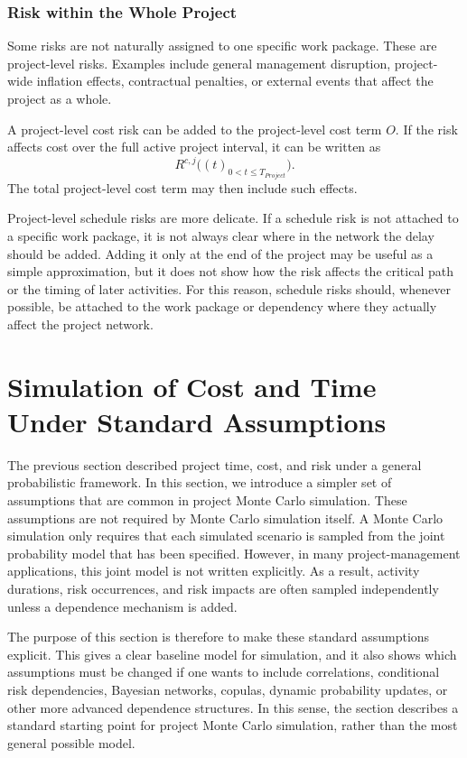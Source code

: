 \documentclass[11pt,a4paper]{article}
\newcommand{\1}{\mathbf{1}}
\theoremstyle{definition}
\theoremstyle{plain}
\theoremstyle{remark}
\numberwithin{equation}{section}
\begin{document}
\subsubsection{Risk within the Whole Project}

Some risks are not naturally assigned to one specific work package. These are project-level risks. Examples include general management disruption, project-wide inflation effects, contractual penalties, or external events that affect the project as a whole.

A project-level cost risk can be added to the project-level cost term $O$. If the risk affects cost over the full active project interval, it can be written as
\[
R^{c,j}\bigl((t)_{0<t\leq T_{Project}}\bigr).
\]
The total project-level cost term may then include such effects.

Project-level schedule risks are more delicate. If a schedule risk is not attached to a specific work package, it is not always clear where in the network the delay should be added. Adding it only at the end of the project may be useful as a simple approximation, but it does not show how the risk affects the critical path or the timing of later activities. For this reason, schedule risks should, whenever possible, be attached to the work package or dependency where they actually affect the project network.






\newpage

\section{Simulation of Cost and Time Under Standard Assumptions}

The previous section described project time, cost, and risk under a general probabilistic framework. In this section, we introduce a simpler set of assumptions that are common in project Monte Carlo simulation. These assumptions are not required by Monte Carlo simulation itself. A Monte Carlo simulation only requires that each simulated scenario is sampled from the joint probability model that has been specified. However, in many project-management applications, this joint model is not written explicitly. As a result, activity durations, risk occurrences, and risk impacts are often sampled independently unless a dependence mechanism is added.

The purpose of this section is therefore to make these standard assumptions explicit. This gives a clear baseline model for simulation, and it also shows which assumptions must be changed if one wants to include correlations, conditional risk dependencies, Bayesian networks, copulas, dynamic probability updates, or other more advanced dependence structures. In this sense, the section describes a standard starting point for project Monte Carlo simulation, rather than the most general possible model.
\end{document}
